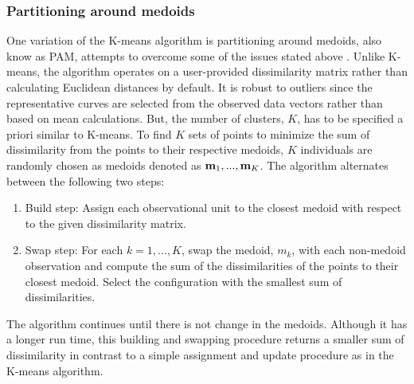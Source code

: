  \subsubsection{Partitioning around medoids}
 One variation of the K-means algorithm is partitioning around medoids, also know as PAM, attempts to overcome some of the issues stated above \cite{kaufman1990}.  Unlike K-means, the algorithm operates on a user-provided dissimilarity matrix rather than calculating Euclidean distances by default. It is robust to outliers since the representative curves are selected from the observed data vectors rather than based on mean calculations. But, the number of clusters, $K$, has to be specified a priori similar to K-means. To find $K$ sets of points to minimize the sum of dissimilarity from the points to their respective medoids, $K$ individuals are randomly chosen as medoids denoted as $\mathbf m_{1},...,\mathbf m_{K}$. The algorithm alternates between the following two steps:
 \begin{enumerate}
\item Build step: Assign each observational unit to the closest medoid with respect to the given dissimilarity matrix.
\item Swap step: For each $k=1,...,K$, swap the medoid, $m_{k}$, with each non-medoid observation and compute the sum of the dissimilarities of the points to their closest medoid. Select the configuration with the smallest sum of dissimilarities.
\end{enumerate}
The algorithm continues until there is not change in the medoids. Although it has a longer run time, this building and swapping procedure returns a smaller sum of dissimilarity in contrast to a simple assignment and update procedure as in the K-means algorithm. 

